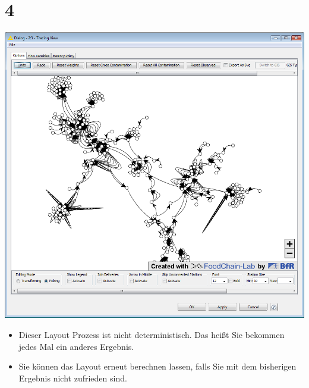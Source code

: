 \documentclass{beamer}
\begin{document}
\section{4}
\begin{frame}
	\begin{center}
  		\includegraphics[height=0.6\textheight]{4.png}
	\end{center}
	\begin{itemize}
		\item Dieser Layout Prozess ist nicht deterministisch. Das heißt Sie bekommen jedes Mal ein anderes Ergebnis.
		\item Sie können das Layout erneut berechnen lassen, falls Sie mit dem bisherigen Ergebnis nicht zufrieden sind.
	\end{itemize}
\end{frame}
\end{document}
